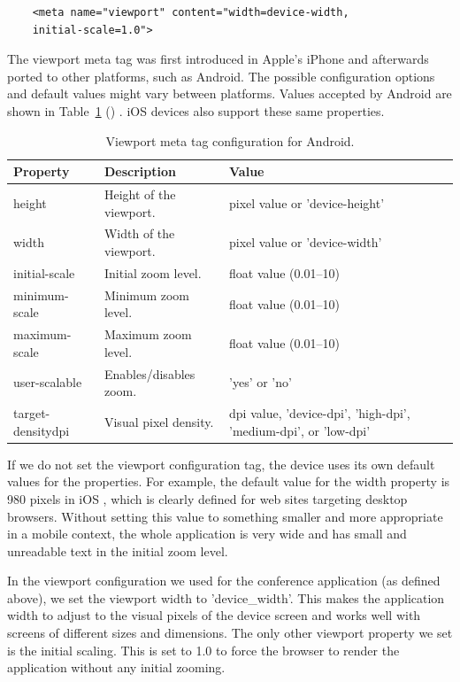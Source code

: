\begin{verbatim}
    <meta name="viewport" content="width=device-width,
    initial-scale=1.0">
\end{verbatim}

The viewport meta tag was first introduced in Apple's iPhone and
afterwards ported to other platforms, such as Android. The possible
configuration options and default values might vary between
platforms. Values accepted by Android are shown in
Table~\ref{table:viewport-meta} ()
\citationneeded. iOS devices also support these same properties.

\begin{table}
  \begin{tabular}{ l | l | p{5cm} }
    \textbf{Property} & \textbf{Description} & \textbf{Value} \\ \hline
    height & Height of the viewport. & pixel value or 'device-height' \\
    width & Width of the viewport. & pixel value or 'device-width' \\
    initial-scale & Initial zoom level. & float value (0.01--10) \\
    minimum-scale & Minimum zoom level. & float value (0.01--10) \\
    maximum-scale & Maximum zoom level. & float value (0.01--10) \\
    user-scalable & Enables/disables zoom. & 'yes' or 'no' \\
    target-densitydpi & Visual pixel density. & dpi value, 'device-dpi', 'high-dpi', 'medium-dpi', or 'low-dpi' \\
  \end{tabular}
  \label{table:viewport-meta}
  \caption{Viewport meta tag configuration for Android.}
\end{table}

If we do not set the viewport configuration tag, the device uses its
own default values for the properties. For example, the default value
for the width property is 980 pixels in iOS \citationneeded, which is
clearly defined for web sites targeting desktop browsers. Without
setting this value to something smaller and more appropriate in a
mobile context, the whole application is very wide and has small and
unreadable text in the initial zoom level.

In the viewport configuration we used for the conference application
(as defined above), we set the viewport width to 'device\_width'. This
makes the application width to adjust to the visual pixels of the
device screen and works well with screens of different sizes and
dimensions. The only other viewport property we set is the initial
scaling. This is set to 1.0 to force the browser to render the
application without any initial zooming.


